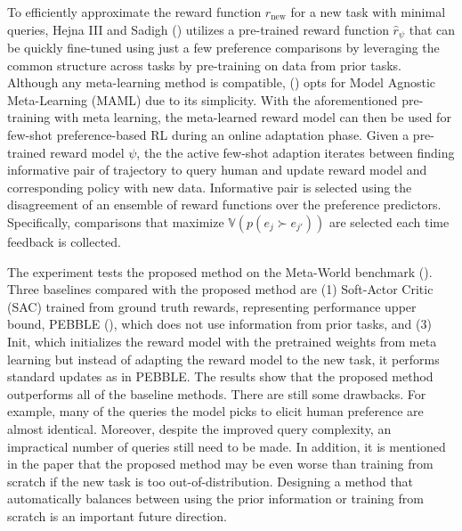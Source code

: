 \documentclass[
  letterpaper,
  numbers=noenddot,
  DIV=11]{scrreprt}
\theoremstyle{definition}
\theoremstyle{plain}
\theoremstyle{plain}
\theoremstyle{remark}
\begin{document}
To efficiently approximate the reward function \(r_\text{new}\) for a
new task with minimal queries, Hejna III and Sadigh
() utilizes a pre-trained reward
function \(\hat{r}_\psi\) that can be quickly fine-tuned using just a
few preference comparisons by leveraging the common structure across
tasks by pre-training on data from prior tasks. Although any
meta-learning method is compatible, () opts for Model Agnostic Meta-Learning (MAML) due
to its simplicity. With the aforementioned pre-training with meta
learning, the meta-learned reward model can then be used for few-shot
preference-based RL during an online adaptation phase. Given a
pre-trained reward model \(\psi\), the the active few-shot adaption
iterates between finding informative pair of trajectory to query human
and update reward model and corresponding policy with new data.
Informative pair is selected using the disagreement of an ensemble of
reward functions over the preference predictors. Specifically,
comparisons that maximize \(\mathbb{V}(p(e_j \succ e_{j'}))\) are
selected each time feedback is collected.

The experiment tests the proposed method on the Meta-World benchmark
(). Three baselines compared
with the proposed method are (1) Soft-Actor Critic (SAC) trained from
ground truth rewards, representing performance upper bound, PEBBLE
(), which does
not use information from prior tasks, and (3) Init, which initializes
the reward model with the pretrained weights from meta learning but
instead of adapting the reward model to the new task, it performs
standard updates as in PEBBLE. The results show that the proposed method
outperforms all of the baseline methods. There are still some drawbacks.
For example, many of the queries the model picks to elicit human
preference are almost identical. Moreover, despite the improved query
complexity, an impractical number of queries still need to be made. In
addition, it is mentioned in the paper that the proposed method may be
even worse than training from scratch if the new task is too
out-of-distribution. Designing a method that automatically balances
between using the prior information or training from scratch is an
important future direction.
\end{document}
